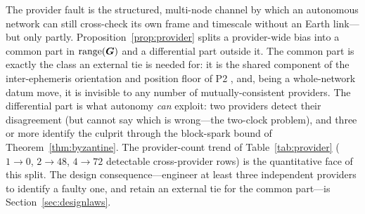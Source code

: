 The provider fault is the structured, multi-node channel by which an autonomous network can
still cross-check its own frame and timescale without an Earth link---but only partly.
Proposition~\ref{prop:provider} splits a provider-wide bias into a common part in
$\operatorname{range}(\bm{G})$ and a differential part outside it. The common part is exactly the class an
external tie is needed for: it is the shared component of the inter-ephemeris orientation and
position floor of P2 \citep{baweja2026interop}, and, being a whole-network datum move, it is
invisible to any number of mutually-consistent providers. The differential part is what
autonomy \emph{can} exploit: two providers detect their disagreement (but cannot say which is
wrong---the two-clock problem), and three or more identify the culprit through the block-spark
bound of Theorem~\ref{thm:byzantine}. The provider-count trend of Table~\ref{tab:provider}
($1\to0$, $2\to48$, $4\to72$ detectable cross-provider rows) is the \Modelled{} quantitative
face of this split. The design consequence---engineer at least three independent providers to
identify a faulty one, and retain an external tie for the common part---is
Section~\ref{sec:designlaws}.
